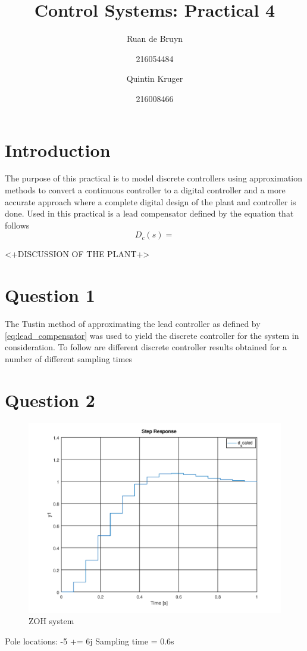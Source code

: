 \documentclass[a4paper, 12pt]{article}
\title{Control Systems: Practical 4}
\author{Ruan de Bruyn \and 216054484 \and Quintin Kruger \and 216008466}
\begin{document}
\maketitle
\newpage
{}
\tableofcontents
\listoffigures
\newpage
{}

\section{Introduction} %
\label{sec:introduction}
The purpose of this practical is to model discrete controllers using approximation methods to convert a continuous controller to a digital controller  and a more accurate approach where a complete digital design of the plant and controller is done. Used in this practical is a lead compensator defined by the equation that follows
\begin{equation}
	\label{eq:lead_compensator}
	D_c(s) = 
\end{equation}

<+DISCUSSION OF THE PLANT+>

\section{Question 1} %
\label{sec:question_1}
The Tustin method of approximating the lead controller as defined by \eqref{eq:lead_compensator} was used to yield the discrete controller for the system in consideration. To follow are different discrete controller results obtained for a number of different sampling times 





\section{Question 2}

\begin{figure}[H]
	\centering
	\includegraphics{./img/2_1.png}
	\caption{ZOH system}
	\label{fig:2_1}
\end{figure}

Pole locations: -5 += 6j
Sampling time = 0.6s

\end{document}
